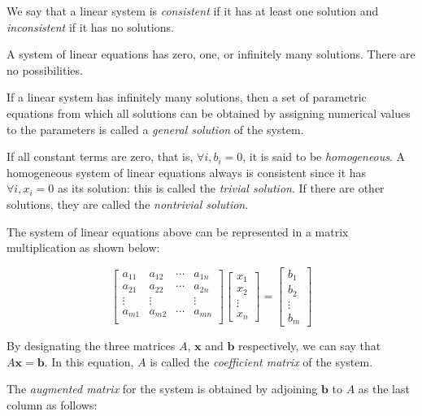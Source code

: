 \documentclass{report}
\begin{document}
		We say that a linear system is \emph{consistent} if it has at least one solution and \emph{inconsistent} if it has no solutions.
		
		\begin{thm}
			A system of linear equations has zero, one, or infinitely many solutions. There are no possibilities.
		\end{thm}
		
		If a linear system has infinitely many solutions, then a set of parametric equations from which all solutions can be obtained by assigning numerical values to the parameters is called a \emph{general solution} of the system.
		
		If all constant terms are zero, that is, $\forall i, b_i=0$, it is said to be \emph{homogeneous}. A homogeneous system of linear equations always is consistent since it has $\forall i, x_i=0$ as its solution: this is called the \emph{trivial solution}. If there are other solutions, they are called the \emph{nontrivial solution}.
		
		The system of linear equations above can be represented in a matrix multiplication as shown below:
		
		\begin{displaymath}
			\begin{bmatrix}
				a_{11} & a_{12} & \cdots & a_{1n} \\
				a_{21} & a_{22} & \cdots & a_{2n} \\
				\vdots & \vdots &        & \vdots \\
				a_{m1} & a_{m2} & \cdots & a_{mn} \\
			\end{bmatrix}
			\begin{bmatrix}
				x_1 \\ x_2 \\ \vdots \\ x_n
			\end{bmatrix}
			=
			\begin{bmatrix}
				b_1 \\ b_2 \\ \vdots \\ b_m
			\end{bmatrix}
		\end{displaymath}
		
		By designating the three matrices $A$, $\bm{x}$ and $\bm{b}$ respectively, we can say that $A\bm{x}=\bm{b}$. In this equation, $A$ is called the \emph{coefficient matrix} of the system.
		
		The \emph{augmented matrix} for the system is obtained by adjoining $\bm{b}$ to $A$ as the last column as follows:
		
\end{document}
